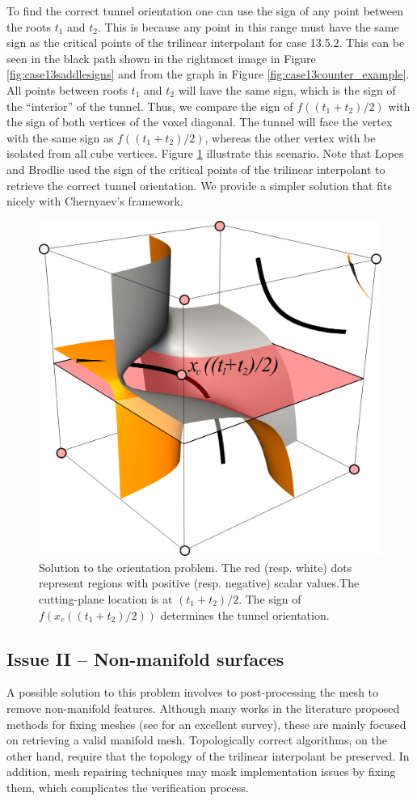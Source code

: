 To find the correct tunnel orientation one can use the sign of any point between the roots $t_1$ and $t_2$. This is because any point in this range must have the same sign as the critical points of the trilinear interpolant for case 13.5.2. This can be seen in the black path shown in the rightmost image in Figure \ref{fig:case13saddlesigns} and from the graph in Figure \ref{fig:case13counter_example}. All points between roots $t_1$ and $t_2$ will have the same sign, which is the sign of the ``interior'' of the tunnel. Thus, we compare the sign of $f((t_1+t_2)/2)$ with the sign of both vertices of the voxel diagonal. The tunnel will face the vertex with the same sign as $f((t_1+t_2)/2)$, whereas the other vertex with be isolated from all cube vertices. Figure \ref{fig:solution-case13} illustrate this scenario. Note that Lopes and Brodlie  \cite{lopes:tvcg:2003} used the sign of the critical points of the trilinear interpolant to retrieve the correct tunnel orientation. We provide a simpler solution that fits nicely with Chernyaev's framework.

\begin{figure}[t]
     \centering
     \includegraphics[width=0.4\linewidth]{chapter4/figures/case13/solution.png}
     \caption{Solution to the orientation problem. The red (resp. white) dots represent regions with positive (resp. negative) scalar values.The cutting-plane location is at $(t_1 + t_2) / 2$. The sign of $f(x_c((t_1+t_2)/2))$ determines the tunnel orientation. }
     \label{fig:solution-case13}
\end{figure}

\subsection{Issue II -- Non-manifold surfaces}

A possible solution to this problem involves to post-processing the mesh to remove non-manifold features. Although  many works in the literature proposed methods for fixing meshes (see \cite{springerlink:10.1007/s11390-009-9206-7} for an excellent survey), these are mainly focused on retrieving a valid manifold mesh. Topologically correct algorithms, on the other hand, require that the topology of the trilinear interpolant  be preserved. In addition, mesh repairing techniques may mask implementation issues by fixing them, which complicates the verification process. 

